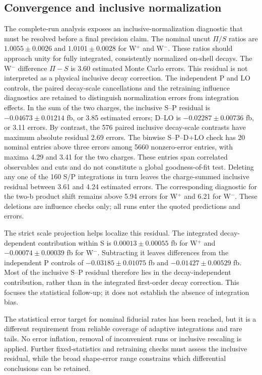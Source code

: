 \subsection{Convergence and inclusive normalization}

The complete-run analysis exposes an inclusive-normalization diagnostic
that must be resolved before a final precision claim. The nominal uncut
$\Pi/S$ ratios are $1.0055\pm0.0026$ and $1.0101\pm0.0028$ for W$^+$ and
W$^-$. These ratios should approach unity for fully integrated, consistently
normalized on-shell decays. The W$^-$ difference $\Pi-S$ is 3.60 estimated
Monte Carlo errors. This residual is not interpreted as a physical
inclusive decay correction. The independent P and LO controls, the
paired decay-scale cancellations and the retraining influence diagnostics
are retained to distinguish normalization errors from integration effects.
In the sum of the two charges, the inclusive S--P residual is
$-0.04673\pm0.01214$ fb, or 3.85 estimated errors; D--LO is
$-0.02287\pm0.00736$ fb, or 3.11 errors. By contrast, the 576 paired
inclusive decay-scale contrasts have maximum absolute residual 2.69 errors.
The binwise S--P--D+LO check has 20 nominal entries above three errors
among 5660 nonzero-error entries, with maxima 4.29 and 3.41 for the two
charges. These entries span correlated observables and cuts and do not
constitute a global goodness-of-fit test.
Deleting any one of the 160 S/P integrations in turn leaves the
charge-summed inclusive residual between 3.61 and 4.24 estimated errors.
The corresponding diagnostic for the two-b product shift remains above
5.94 errors for W$^+$ and 6.21 for W$^-$. These deletions are influence
checks only; all runs enter the quoted predictions and errors.

The strict scale projection helps localize this residual. The integrated
decay-dependent contribution within S is
$0.00013\pm0.00055$ fb for W$^+$ and
$-0.00074\pm0.00039$ fb for W$^-$. Subtracting it leaves differences from
the independent P controls of $-0.03185\pm0.01075$ fb and
$-0.01427\pm0.00529$ fb. Most of the inclusive S--P residual therefore
lies in the decay-independent contribution, rather than in the integrated
first-order decay correction. This focuses the statistical follow-up;
it does not establish the absence of integration bias.

The statistical error target for nominal fiducial rates has been reached,
but it is a different requirement from reliable coverage of adaptive
integrations and rare tails. No error inflation, removal of inconvenient
runs or inclusive rescaling is applied. Further fixed-statistics and
retraining checks must assess the inclusive residual, while the broad
shape-error range constrains which differential conclusions can be retained.

